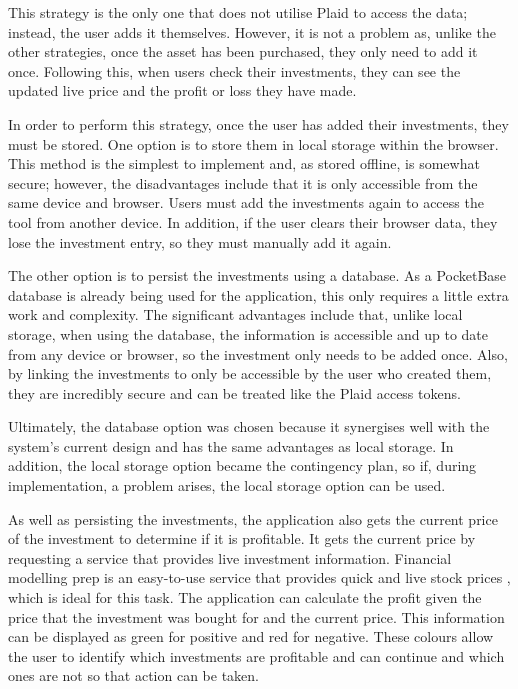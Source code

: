 This strategy is the only one that does not utilise Plaid to access the data; instead, the user adds it themselves. However, it is not a problem as, unlike the other strategies, once the asset has been purchased, they only need to add it once. Following this, when users check their investments, they can see the updated live price and the profit or loss they have made.

In order to perform this strategy, once the user has added their investments, they must be stored. One option is to store them in local storage within the browser. This method is the simplest to implement and, as stored offline, is somewhat secure; however, the disadvantages include that it is only accessible from the same device and browser. Users must add the investments again to access the tool from another device. In addition, if the user clears their browser data, they lose the investment entry, so they must manually add it again.

The other option is to persist the investments using a database. As a PocketBase database is already being used for the application, this only requires a little extra work and complexity. The significant advantages include that, unlike local storage, when using the database, the information is accessible and up to date from any device or browser, so the investment only needs to be added once. Also, by linking the investments to only be accessible by the user who created them, they are incredibly secure and can be treated like the Plaid access tokens.

Ultimately, the database option was chosen because it synergises well with the system's current design and has the same advantages as local storage. In addition, the local storage option became the contingency plan, so if, during implementation, a problem arises, the local storage option can be used.

As well as persisting the investments, the application also gets the current price of the investment to determine if it is profitable. It gets the current price by requesting a service that provides live investment information. Financial modelling prep is an easy-to-use service that provides quick and live stock prices \cite{FMP}, which is ideal for this task. The application can calculate the profit given the price that the investment was bought for and the current price. This information can be displayed as green for positive and red for negative. These colours allow the user to identify which investments are profitable and can continue and which ones are not so that action can be taken.

